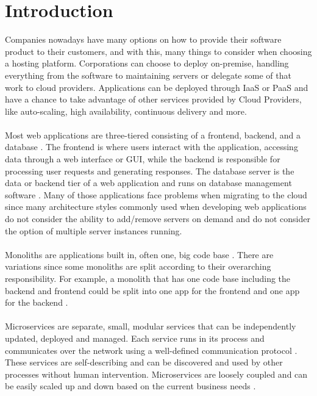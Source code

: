 \documentclass[BIF,Bachelor,nenglish]{twbook}%
\begin{document}
\maketitle

%
%
\chapter{Introduction}
Companies nowadays have many options on how to provide their software product to their customers, and with this, many things to consider when choosing a hosting platform. Corporations can choose to deploy on-premise, handling everything from the software to maintaining servers or delegate some of that work to cloud providers. Applications can be deployed through \ac{IaaS} \cite{microIaas} or \ac{PaaS} \cite{redPaas} and have a chance to take advantage of other services provided by Cloud Providers, like auto-scaling, high availability, continuous delivery and more.
\\
\\
Most web applications are three-tiered consisting of a frontend, backend, and a database \cite{liu2005}. The frontend is where users interact with the application, accessing data through a web interface or \ac{GUI}, while the backend is responsible for processing user requests and generating responses. The database server is the data or backend tier of a web application and runs on database management software \cite{ibm3t}. Many of those applications face problems when migrating to the cloud since many architecture styles commonly used when developing web applications do not consider the ability to add/remove servers on demand and do not consider the option of multiple server instances running.
\\
\\
Monoliths are applications built in, often one, big code base \cite{migmonomicro}. There are variations since some monoliths are split according to their overarching responsibility. For example, a monolith that has one code base including the backend and frontend could be split into one app for the frontend and one app for the backend \cite{chllng}.
\\
\\
Microservices are separate, small, modular services that can be independently updated, deployed and managed. Each service runs in its process and communicates over the network using a well-defined communication protocol \cite{fow2014}. These services are self-describing and can be discovered and used by other processes without human intervention. Microservices are loosely coupled and can be easily scaled up and down based on the current business needs \cite{ade2017}.
\end{document}
